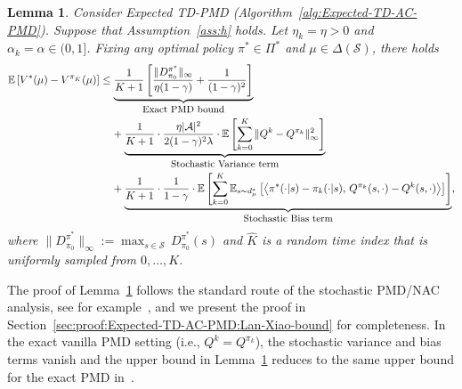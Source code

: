 \documentclass[10pt]{article}
\newcommand{\calA}{\mathcal{A}}
\newcommand{\calS}{\mathcal{S}}
\newcommand{\E}{\mathbb{E}}
\newcommand{\ls}{\left}
\newcommand{\rs}{\right}
\theoremstyle{plain}
\newtheorem{lemma}[theorem]{Lemma}
\theoremstyle{definition}
\begin{document}
\begin{lemma}
    Consider Expected TD-PMD \textup{(}Algorithm~\ref{alg:Expected-TD-AC-PMD}\textup{)}. Suppose that Assumption~\ref{ass:h} holds. Let $\eta_k = \eta > 0$ and $\alpha_k = \alpha \in (0,1]$. Fixing any optimal policy $\pi^* \in \Pi^*$ and $\mu \in \Delta(\calS)$, there holds
    \begin{align*}
        \E\ls[ V^*(\mu) - V^{\pi_{\hat K}}(\mu) \rs] &\leq \underbrace{\frac{1}{K+1} \ls[ \frac{\| D^{\pi^*}_{\pi_0} \|_\infty}{\eta(1-\gamma)} + \frac{1}{(1-\gamma)^2}  \rs]}_{\mbox{\small Exact PMD bound}} \\
        &\;\;\;\;+ \underbrace{\frac{1}{K+1} \cdot \frac{\eta |\calA|^2}{2(1-\gamma)^2\lambda} \cdot \E\ls[ \sum_{k=0}^K \| Q^{k} - Q^{\pi_k} \|_\infty^2 \rs]}_{\mbox{\small Stochastic Variance term}} \\
        &\;\;\;\;+ \underbrace{\frac{1}{K+1} \cdot \frac{1}{1-\gamma} \cdot \E \ls[ \sum_{k=0}^K \E_{s\sim d^*_\mu} \ls[ \ls\langle \pi^*(\cdot|s) - \pi_k(\cdot|s), \, Q^{\pi_k}(s,\cdot) - Q^k(s,\cdot) \rs\rangle \rs] \rs]}_{\mbox{\small Stochastic Bias term}},
    \end{align*}
    where $\| D^{\pi^*}_{\pi_0} \|_\infty := \max_{s\in\calS} \, D^{\pi^*}_{\pi_0}(s)$ and $\hat K$ is a random time index that is uniformly sampled from $0, \dots, K$. 
    \label{lem:Expected-TD-AC-PMD:Lan-Xiao-bound}
\end{lemma}


    The proof of Lemma~\ref{lem:Expected-TD-AC-PMD:Lan-Xiao-bound}  follows the standard route of the  stochastic PMD/NAC analysis, see for example~\citet{Lan_2021,khodadadian2022finite,xu2020improving,xu2020non,fu2021single,Xiao_2022,li2024stochastic,liu2025tdpmd,li2025policy}, and we present the proof in Section~\ref{sec:proof:Expected-TD-AC-PMD:Lan-Xiao-bound} for completeness. In the exact vanilla PMD setting (i.e., $Q^k = Q^{\pi_k}$), the stochastic variance and bias terms vanish and the upper bound in Lemma~\ref{lem:Expected-TD-AC-PMD:Lan-Xiao-bound} reduces to the same upper bound for the  exact PMD in~\citet[Theorem~8]{Xiao_2022}.
    
\end{document}
